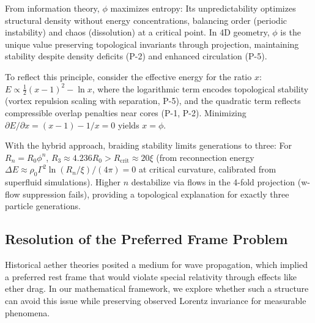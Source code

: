 From information theory, $\phi$ maximizes entropy: Its unpredictability optimizes structural density without energy concentrations, balancing order (periodic instability) and chaos (dissolution) at a critical point. In 4D geometry, $\phi$ is the unique value preserving topological invariants through projection, maintaining stability despite density deficits (P-2) and enhanced circulation (P-5).

To reflect this principle, consider the effective energy for the ratio $x$: $E \propto \frac{1}{2} (x - 1)^2 - \ln x$, where the logarithmic term encodes topological stability (vortex repulsion scaling with separation, P-5), and the quadratic term reflects compressible overlap penalties near cores (P-1, P-2). Minimizing $\partial E / \partial x = (x - 1) - 1/x = 0$ yields $x = \phi$.

With the hybrid approach, braiding stability limits generations to three: For $R_n = R_0 \phi^n$, $R_3 \approx 4.236 R_0 > R_{\text{crit}} \approx 20 \xi$ (from reconnection energy $\Delta E \approx \rho_0 \Gamma^2 \ln(R_n / \xi) / (4\pi) = 0$ at critical curvature, calibrated from superfluid simulations). Higher $n$ destabilize via flows in the 4-fold projection (w-flow suppression fails), providing a topological explanation for exactly three particle generations.

\medskip
\noindent
{}
\medskip

\subsection{Resolution of the Preferred Frame Problem}

Historical aether theories posited a medium for wave propagation, which implied a preferred rest frame that would violate special relativity through effects like ether drag. In our mathematical framework, we explore whether such a structure can avoid this issue while preserving observed Lorentz invariance for measurable phenomena.


